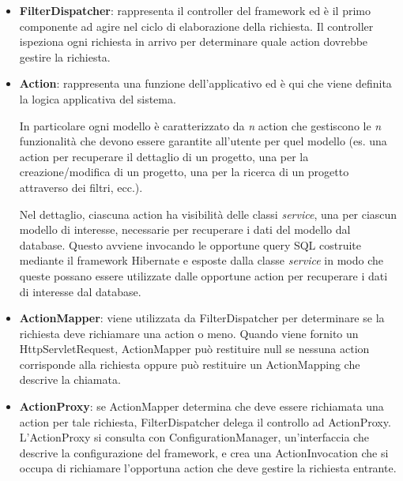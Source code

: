 \begin{itemize}
\item \textbf{FilterDispatcher}: rappresenta il controller del framework ed è il primo componente ad agire nel ciclo di elaborazione della richiesta. Il controller ispeziona ogni richiesta in arrivo per determinare quale action dovrebbe gestire la richiesta.
\setlength{\parskip}{3ex}

\item \textbf{Action}: rappresenta una funzione dell'applicativo ed è qui che viene definita la logica applicativa del sistema.

\setlength{\parskip}{2ex}

In particolare ogni modello è caratterizzato da \textit{n} action che gestiscono le \textit{n} funzionalità che devono essere garantite all'utente per quel modello (es. una action per recuperare il dettaglio di un progetto, una per la creazione/modifica di un progetto, una per la ricerca di un progetto attraverso dei filtri, ecc.).

\setlength{\parskip}{2ex}

Nel dettaglio, ciascuna action ha visibilità delle classi \textit{service}, una per ciascun modello di interesse, necessarie per recuperare i dati del modello dal database. Questo avviene invocando le opportune query SQL costruite mediante il framework Hibernate e esposte dalla classe \textit{service} in modo che queste possano essere utilizzate dalle opportune action per recuperare i dati di interesse dal database.

\setlength{\parskip}{3ex}

\item \textbf{ActionMapper}: viene utilizzata da FilterDispatcher per determinare se la richiesta deve richiamare una action o meno. Quando viene fornito un HttpServletRequest, ActionMapper può restituire null se nessuna action corrisponde alla richiesta  oppure può restituire un ActionMapping che descrive la chiamata.

\setlength{\parskip}{3ex}

\item \textbf{ActionProxy}: se ActionMapper determina che deve essere richiamata una action per tale richiesta, FilterDispatcher delega il controllo ad ActionProxy. L'ActionProxy si consulta con ConfigurationManager, un'interfaccia che descrive la configurazione del framework, e crea una ActionInvocation che si occupa di richiamare l'opportuna action che deve gestire la richiesta entrante.
\setlength{\parskip}{3ex}


\end{itemize}
